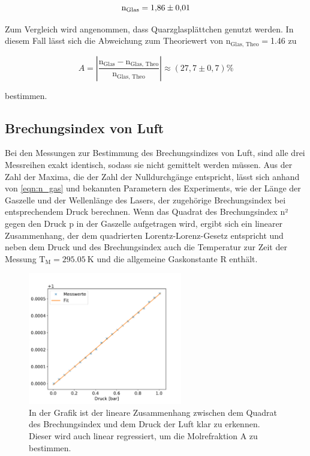         \begin{equation}
            \text{n}_{\text{Glas}} = \num{1.86 +- 0.01}
        \end{equation}

        Zum Vergleich wird angenommen, dass Quarzglasplättchen genutzt werden. In diesem Fall lässt sich die Abweichung zum Theoriewert von $\text{n}_{\text{Glas, Theo}}=$\num{1.46}\cite{theeten_new_1978} zu

        \begin{equation*}
            A= \left|\frac{\text{n}_{\text{Glas}} - \text{n}_{\text{Glas, Theo}}}{\text{n}_{\text{Glas, Theo}}}\right| \approx (27,7 \pm 0,7) \%
        \end{equation*}

        bestimmen.


    \subsection{Brechungsindex von Luft}
        Bei den Messungen zur Bestimmung des Brechungsindizes von Luft, sind alle drei Messreihen exakt identisch, sodass sie nicht gemittelt werden müssen. Aus der Zahl der Maxima, die der Zahl der 
        Nulldurchgänge entspricht, lässt sich anhand von \eqref{eqn:n_gas} und bekannten Parametern des Experiments, wie der Länge der Gaszelle und der Wellenlänge des Lasers, der zugehörige Brechungsindex
        bei entsprechendem Druck berechnen. Wenn das Quadrat des Brechungsindex n² gegen den Druck p in der Gaszelle aufgetragen wird, ergibt sich ein linearer Zusammenhang, der dem quadrierten Lorentz-Lorenz-Gesetz entspricht und neben dem Druck und des Brechungsindex auch die Temperatur zur Zeit der Messung $\text{T}_{\text{M}}=\SI{295.05}{\kelvin}$ und die allgemeine Gaskonstante R enthält. 


        \FloatBarrier

        \begin{figure}[h]
          \centering
          \includegraphics[width = 0.6\textwidth]{pictures/n_quad_fit.pdf}
          \caption{In der Grafik ist der lineare Zusammenhang zwischen dem Quadrat des Brechungsindex und dem Druck der Luft klar zu erkennen. Dieser wird auch linear regressiert, um die Molrefraktion A zu bestimmen.}
          \label{fig:n_quad_fit}
        \end{figure}

